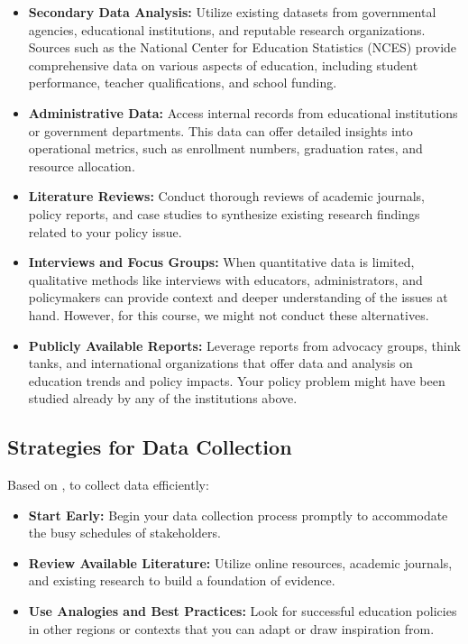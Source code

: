 \documentclass{article}
\theoremstyle{definition}
\theoremstyle{plain}
\begin{document}
\begin{itemize}
  \item \textbf{Secondary Data Analysis:} Utilize existing datasets from governmental agencies, educational institutions, and reputable research organizations. Sources such as the National Center for Education Statistics (NCES) provide comprehensive data on various aspects of education, including student performance, teacher qualifications, and school funding.
  
  \item \textbf{Administrative Data:} Access internal records from educational institutions or government departments. This data can offer detailed insights into operational metrics, such as enrollment numbers, graduation rates, and resource allocation.
  
  \item \textbf{Literature Reviews:} Conduct thorough reviews of academic journals, policy reports, and case studies to synthesize existing research findings related to your policy issue.
  
  \item \textbf{Interviews and Focus Groups:} When quantitative data is limited,
  qualitative methods like interviews with educators, administrators, and
  policymakers can provide context and deeper understanding of the issues
  at hand. However, for this course, we might not conduct these alternatives.
    
  \item \textbf{Publicly Available Reports:} Leverage reports from advocacy
  groups, think tanks, and international organizations that offer data and
analysis on education trends and policy impacts. Your policy problem might have
been studied already by any of the institutions above.
  
\end{itemize}


\subsection{Strategies for Data Collection}

Based on \citet{Bardach2020}, to collect data efficiently:

\begin{itemize}
    \item \textbf{Start Early:} Begin your data collection process promptly to accommodate the busy schedules of stakeholders.
    
    \item \textbf{Review Available Literature:} Utilize online resources, academic journals, and existing research to build a foundation of evidence.
    
    \item \textbf{Use Analogies and Best Practices:} Look for successful education policies in other regions or contexts that you can adapt or draw inspiration from.
\end{itemize}
\end{document}

